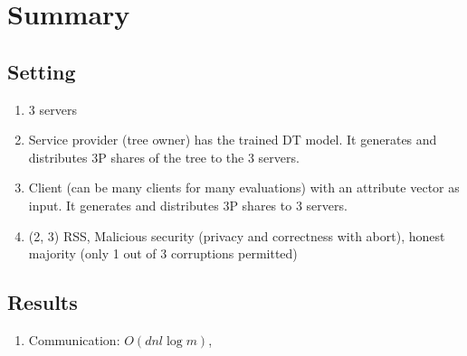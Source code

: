 
\clearpage
{}

%
\setcounter{section}{0} %

\section{Summary}

\subsection{Setting}
\begin{enumerate}
    \item 3 servers
    \item Service provider (tree owner) has the trained DT model. It generates and distributes 3P shares of the tree to the 3 servers.
    \item Client (can be many clients for many evaluations) with an attribute vector as input. It generates and distributes 3P shares to 3 servers.
    \item (2, 3) RSS, Malicious security (privacy and correctness with abort), honest majority (only 1 out of 3 corruptions permitted)
\end{enumerate}

\subsection{Results}
\begin{enumerate}
    \item Communication: $O(dnl \log m)$, 
\end{enumerate}





%

